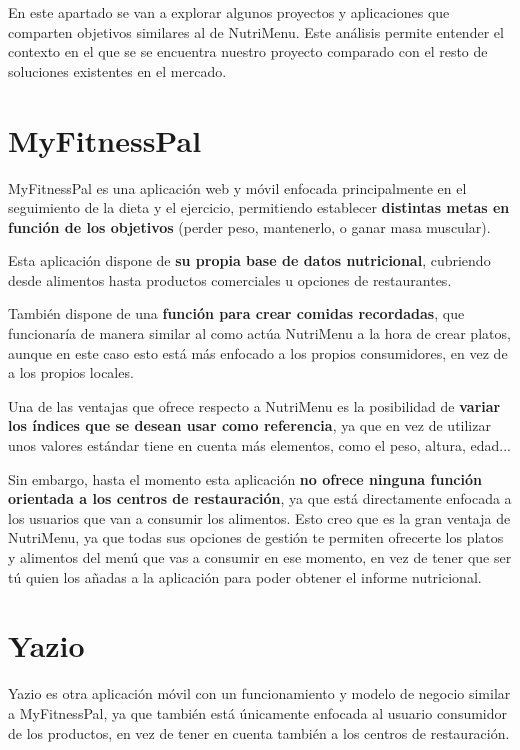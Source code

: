 
En este apartado se van a explorar algunos proyectos y aplicaciones que comparten objetivos similares al de NutriMenu. Este análisis permite entender el contexto en el que se se encuentra nuestro proyecto comparado con el resto de soluciones existentes en el mercado.

\section{MyFitnessPal}

MyFitnessPal es una aplicación web y móvil enfocada principalmente en el seguimiento de la dieta y el ejercicio, permitiendo establecer \textbf{distintas metas en función de los objetivos} (perder peso, mantenerlo, o ganar masa muscular).

Esta aplicación dispone de \textbf{su propia base de datos nutricional}, cubriendo desde alimentos hasta productos comerciales u opciones de restaurantes. 

También dispone de una \textbf{función para crear comidas recordadas}, que funcionaría de manera similar al como actúa NutriMenu a la hora de crear platos, aunque en este caso esto está más enfocado a los propios consumidores, en vez de a los propios locales.

Una de las ventajas que ofrece respecto a NutriMenu es la posibilidad de \textbf{variar los índices que se desean usar como referencia}, ya que en vez de utilizar unos valores estándar tiene en cuenta más elementos, como el peso, altura, edad... \cite{myfitnesspal:main}

Sin embargo, hasta el momento esta aplicación \textbf{no ofrece ninguna función orientada a los centros de restauración}, ya que está directamente enfocada a los usuarios que van a consumir los alimentos. Esto creo que es la gran ventaja de NutriMenu, ya que todas sus opciones de gestión te permiten ofrecerte los platos y alimentos del menú que vas a consumir en ese momento, en vez de tener que ser tú quien los añadas a la aplicación para poder obtener el informe nutricional.

\section{Yazio}

Yazio es otra aplicación móvil con un funcionamiento y modelo de negocio similar a MyFitnessPal, ya que también está únicamente enfocada al usuario consumidor de los productos, en vez de tener en cuenta también a los centros de restauración.

